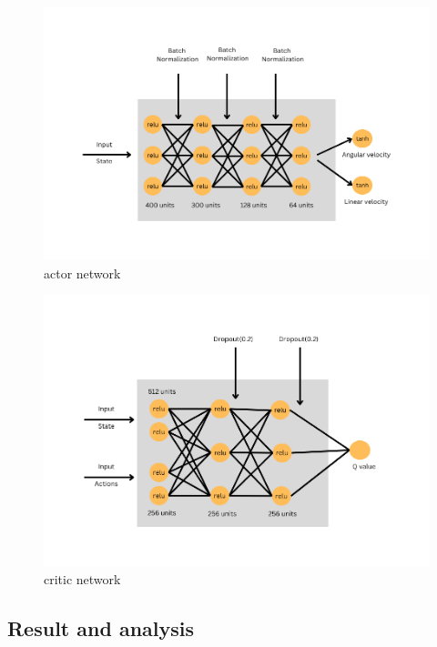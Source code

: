 \documentclass[12pt]{extarticle}
\begin{document}
    
 \begin{figure}[t]  
\centering
\includegraphics[scale=0.60]{actor_net}
\caption[actor network]{actor network}
\end{figure}

 \begin{figure}[h]  
\centering
\includegraphics[scale=0.60]{critic_net}
\caption[critic network]{critic network}
\end{figure}

\afterpage{\clearpage}








\newpage
\pagebreak
\hspace{0pt}
\vfill
\begin{center}
\section{Result and analysis}
\end{center}
\vfill
\hspace{0pt}
\end{document}
